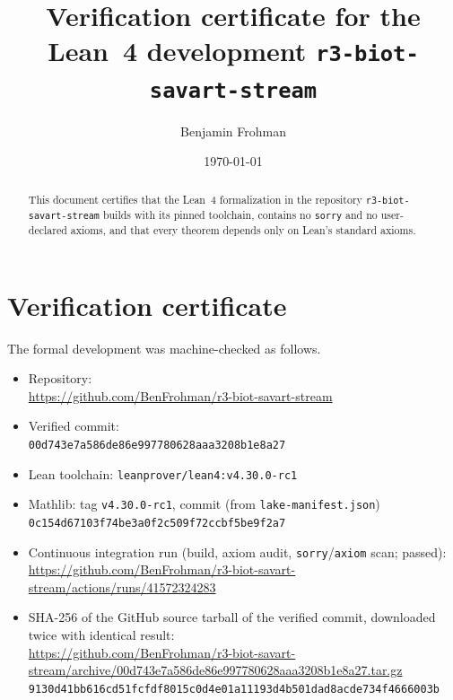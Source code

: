 \documentclass[11pt]{amsart}
\title{Verification certificate for the Lean~4 development \texttt{r3-biot-savart-stream}}
\author{Benjamin Frohman}
\date{\today}
\begin{document}
\begin{abstract}
This document certifies that the Lean~4 formalization in the repository \texttt{r3-biot-savart-stream} builds with its pinned toolchain, contains no \texttt{sorry} and no user-declared axioms, and that every theorem depends only on Lean's standard axioms.
\end{abstract}
\maketitle
{}\par

\section{Verification certificate}

The formal development was machine-checked as follows.

{\raggedright
\begin{itemize}
\item Repository:\\ {\footnotesize\url{https://github.com/BenFrohman/r3-biot-savart-stream}}
\item Verified commit:\\ {\footnotesize\texttt{00d743e7a586de86e997780628aaa3208b1e8a27}}
\item Lean toolchain: \texttt{leanprover/lean4:v4.30.0-rc1}
\item Mathlib: tag \texttt{v4.30.0-rc1}, commit (from \texttt{lake-manifest.json})\\ {\footnotesize\texttt{0c154d67103f74be3a0f2c509f72ccbf5be9f2a7}}
\item Continuous integration run (build, axiom audit, \texttt{sorry}/\texttt{axiom} scan; passed):\\ {\footnotesize\url{https://github.com/BenFrohman/r3-biot-savart-stream/actions/runs/41572324283}}
\item SHA-256 of the GitHub source tarball of the verified commit, downloaded twice with identical result:\\ {\footnotesize\url{https://github.com/BenFrohman/r3-biot-savart-stream/archive/00d743e7a586de86e997780628aaa3208b1e8a27.tar.gz}}\\
{\footnotesize\texttt{9130d41bb616cd51fcfdf8015c0d4e01a11193d4b501dad8acde734f4666003b}}
\end{itemize}\par}
\end{document}
